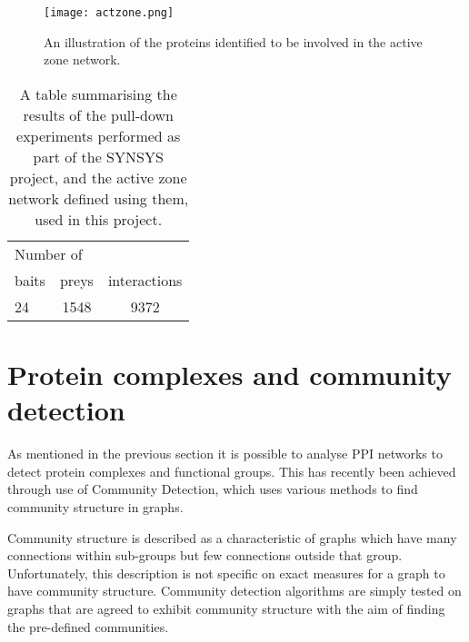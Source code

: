 \begin{figure}
    \centering
    \texttt{[image: actzone.png]}
    \caption{An illustration of the proteins identified to be involved in the active zone network\autocite{chua_architecture_2010}.}
    \label{fig:actzone}
\end{figure}

\begin{table}
    \centering
    \begin{tabular}{l c c} 
        \multicolumn{3}{*}{Number of} \\
        baits   & preys & interactions \\
        \hline
        24      & 1548  & 9372 \\
    \end{tabular}
    \caption{A table summarising the results of the pull-down experiments performed as part of the SYNSYS project\autocite{synsys}, and the active zone network defined using them, used in this project.}
    \label{tab:synsys}
\end{table}


\section{Protein complexes and community detection}

As mentioned in the previous section it is possible to analyse \ac{PPI} networks to detect protein complexes and functional groups. %
This has recently been achieved through use of Community Detection\autocites{chen_identifying_2013,wang_recent_2010}, which uses various methods to find community structure in graphs.

Community structure is described as a characteristic of graphs which have many connections within sub-groups but few connections outside that group\autocite{newman_communities_2012}.
Unfortunately, this description is not specific on exact measures for a graph to have community structure. %
Community detection algorithms are simply tested on graphs that are agreed to exhibit community structure with the aim of finding the pre-defined communities. %


